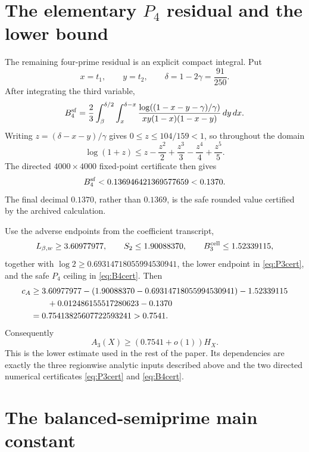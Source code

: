 \documentclass{aomart}
\theoremstyle{definition}
\newcommand{\1}{\mathbf 1}
\begin{document}
\section{The elementary $P_4$ residual and the lower bound}\label{sec:p4}

The remaining four-prime residual is an explicit compact integral.  Put
\[
 x=t_1,\qquad y=t_2,\qquad \delta=1-2\gamma=\frac{91}{250}.
\]
After integrating the third variable,
\begin{equation}\label{eq:B4integral}
 B_4^{\rm sf}=\frac23\int_\beta^{\delta/2}\int_x^{\delta-x}
 \frac{\log\!\left((1-x-y-\gamma)/\gamma\right)}{xy(1-x)(1-x-y)}\,dy\,dx.
\end{equation}
Writing $z=(\delta-x-y)/\gamma$ gives $0\le z\le104/159<1$, so throughout the domain
\begin{equation}\label{eq:logmajorant}
 \log(1+z)\le z-\frac{z^2}{2}+\frac{z^3}{3}-\frac{z^4}{4}+\frac{z^5}{5}.
\end{equation}
The directed $4000\times4000$ fixed-point certificate  then gives
\begin{equation}\label{eq:B4cert}
 B_4^{\rm sf}<0.136946421369577659<0.1370.
\end{equation}
The final decimal $0.1370$, rather than $0.1369$, is the safe rounded value certified by the archived calculation.

Use the adverse endpoints from the coefficient transcript,
\[
 L_{\beta,w}\ge3.60977977,\qquad
 S_2\le1.90088370,\qquad
 B_3^{\rm cell}\le1.52339115,
\]
together with $\log2\ge0.69314718055994530941$, the lower endpoint in \eqref{eq:P3cert}, and the safe $P_4$ ceiling in \eqref{eq:B4cert}.  Then
\begin{align}
 c_A
 &\ge3.60977977-(1.90088370-0.69314718055994530941)
       -1.52339115 \notag\\
 &\qquad +0.012486155517280623-0.1370 \notag\\
 &=0.75413825607722593241>0.7541.\label{eq:lowercoef}
\end{align}
Consequently
\begin{equation}\label{eq:lowerbound}
 A_3(X)\ge(0.7541+o(1))H_X.
\end{equation}
This is the lower estimate used in the rest of the paper.  Its dependencies are exactly the three regionwise analytic inputs described above and the two directed numerical certificates \eqref{eq:P3cert} and \eqref{eq:B4cert}.

\section{The balanced-semiprime main constant}\label{sec:upper}
\end{document}
